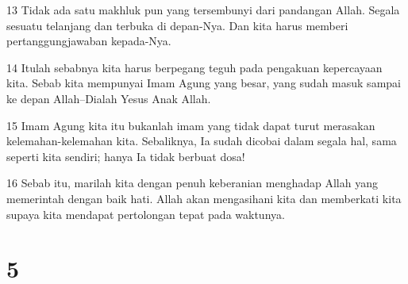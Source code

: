 \par 13 Tidak ada satu makhluk pun yang tersembunyi dari pandangan Allah. Segala sesuatu telanjang dan terbuka di depan-Nya. Dan kita harus memberi pertanggungjawaban kepada-Nya.
\par 14 Itulah sebabnya kita harus berpegang teguh pada pengakuan kepercayaan kita. Sebab kita mempunyai Imam Agung yang besar, yang sudah masuk sampai ke depan Allah--Dialah Yesus Anak Allah.
\par 15 Imam Agung kita itu bukanlah imam yang tidak dapat turut merasakan kelemahan-kelemahan kita. Sebaliknya, Ia sudah dicobai dalam segala hal, sama seperti kita sendiri; hanya Ia tidak berbuat dosa!
\par 16 Sebab itu, marilah kita dengan penuh keberanian menghadap Allah yang memerintah dengan baik hati. Allah akan mengasihani kita dan memberkati kita supaya kita mendapat pertolongan tepat pada waktunya.

\chapter{5}


